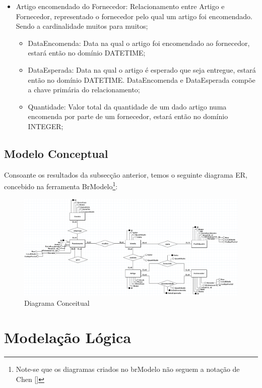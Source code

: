 \documentclass[a4paper,12pt]{scrreprt}
\begin{document}
\begin{itemize}
\begin{itemize}
                     \end{itemize}
                 \item{Artigo encomendado do Fornecedor:} Relacionamento entre Artigo e Fornecedor, representado o fornecedor pelo qual um artigo foi encomendado. Sendo a cardinalidade muitos para muitos;
                     \begin{itemize}
                     \item{DataEncomenda:} Data na qual o artigo foi encomendado ao fornecedor, estará então no domínio DATETIME;
                     \item{DataEsperada:} Data na qual o artigo é esperado que seja entregue, estará então no domínio DATETIME. DataEncomenda e DataEsperada compõe a chave primária do relacionamento;
                     \item{Quantidade:} Valor total da quantidade de um dado artigo numa encomenda por parte de um fornecedor, estará então no domínio INTEGER;
                       
                     \end{itemize}
             \end{itemize}
\newpage
        \subsection{Modelo Conceptual}
        Consoante os resultados da subsecção anterior, temos o seguinte diagrama ER,
        concebido na ferramenta BrModelo\footnote{Note-se que os diagramas criados no brModelo
        não seguem a notação de Chen [\cite{chen}]}:
        \begin{figure}[H]
            \centering
            \includegraphics[width=4.75in]{images/Conceptual_Com_Atributos.png}
            \caption{Diagrama Conceitual}
        \end{figure}
        
\section{Modelação Lógica}
\end{document}
